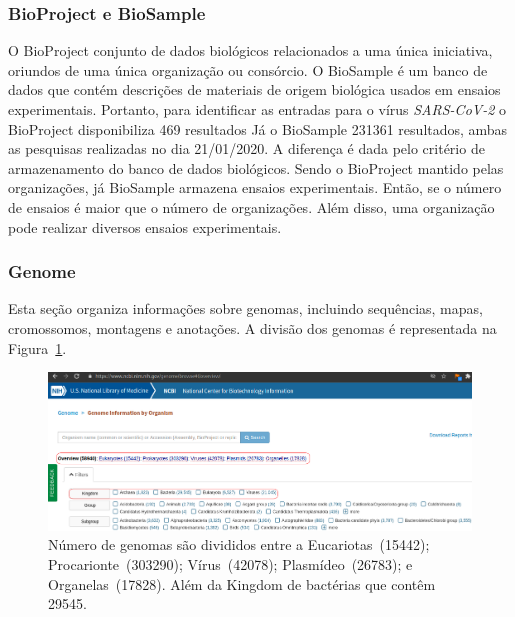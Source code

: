 


\subsubsection{BioProject e BioSample}

O BioProject conjunto de dados biológicos relacionados a uma única iniciativa, oriundos de uma única organização ou consórcio.
O BioSample é um banco de dados que contém descrições de materiais de origem biológica usados em ensaios experimentais.
Portanto, para identificar as entradas para o vírus \textit{SARS-CoV-2} o BioProject disponibiliza 469 resultados
Já o  BioSample 231361 resultados, ambas as pesquisas realizadas no dia 21/01/2020.
A diferença é dada pelo critério de armazenamento do banco de dados biológicos.
Sendo o BioProject mantido pelas organizações, já BioSample armazena ensaios experimentais.
Então, se o número de ensaios é maior que o número de organizações.
Além disso, uma organização pode realizar diversos ensaios experimentais. 


\newpage
\subsubsection{Genome}

Esta seção organiza informações sobre genomas, incluindo sequências, mapas, cromossomos, montagens e anotações.
A divisão dos genomas é representada na Figura~\ref{img:genomas}.


\begin{figure}[!htp]
    \centering
    \includegraphics[scale=.36]{img/genome.png}
    \caption{
        Número de genomas são divididos entre a Eucariotas~(15442);  Procarionte~(303290); Vírus~(42078); Plasmídeo~(26783); e Organelas~(17828).
        Além da Kingdom de bactérias que contêm 29545.
    } 
    \label{img:genomas}
\end{figure}


